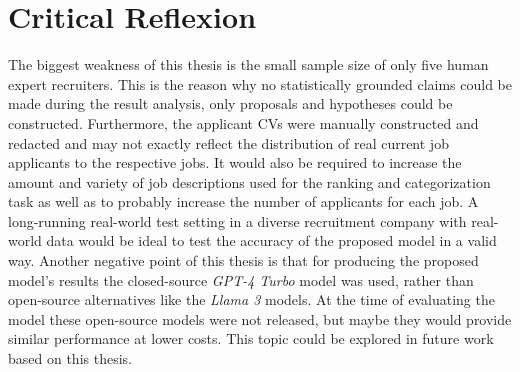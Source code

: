\documentclass[draft,final]{thesisclass} %
\begin{document}
\section{Critical Reflexion}
The biggest weakness of this thesis is the small sample size of only five human expert recruiters. This is the reason why no statistically grounded claims could be made during the result analysis, only proposals and hypotheses could be constructed. Furthermore, the applicant \acs{CV}s were manually constructed and redacted and may not exactly reflect the distribution of real current job applicants to the respective jobs. It would also be required to increase the amount and variety of job descriptions used for the ranking and categorization task as well as to probably increase the number of applicants for each job. A long-running real-world test setting in a diverse recruitment company with real-world data would be ideal to test the accuracy of the proposed model in a valid way. Another negative point of this thesis is that for producing the proposed model's results the closed-source \textit{GPT-4 Turbo} model was used, rather than open-source alternatives like the \textit{Llama 3} models. At the time of evaluating the model these open-source models were not released, but maybe they would provide similar performance at lower costs. This topic could be explored in future work based on this thesis.
\end{document}
